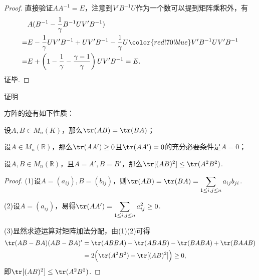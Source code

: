 \begin{proof}
	直接验证$AA^{-1}=E$，注意到$V'B^{-1}U$作为一个数可以提到矩阵乘积外，有
	\begin{align*}
		  & {}A(B^{-1}-\frac{1}{\gamma}B^{-1}UV'B^{-1})                                                     \\
		= & {}E-\frac{1}{\gamma}UV'B^{-1}+UV'B^{-1}-\frac{1}{\gamma}U{\color{red!70!blue}V'B^{-1}U}V'B^{-1} \\
		= & {}E+\left(1-\frac{1}{\gamma}-\frac{\gamma-1}{\gamma}\right)UV'B^{-1}=E.
	\end{align*}
	证毕.
\end{proof}
\begin{prob}[23]
	\hypertarget{TraceProperty}{证明}方阵的迹有如下性质：
	\begin{mylist}
		\item 设$A,B\in M_n(K)$，那么$\tr(AB)=\tr(BA)$；
		\item 设$A\in M_n(\mathbb{R})$，那么$\tr(AA')\ge0$且$\tr(AA')=0$的充分必要条件是$A=0$；
		\item 设$A,B\in M_n(\mathbb{R})$，且$A=A',B=B'$，那么$\tr[(AB)^2]\le\tr(A^2B^2)$.
	\end{mylist}
\end{prob}
\begin{proof}
	(1)设$A=(a_{ij}),B=(b_{ij})$，则$\tr(AB)=\tr(BA)=\displaystyle\sum_{1\le i,j\le n}a_{ij}b_{ji}$.\par
	(2)设$A=(a_{ij})$，易得$\tr(AA')=\displaystyle\sum_{1\le i,j\le n}a_{ij}^2\ge0$.\par
	(3)显然求迹运算对矩阵加法分配，由(1)(2)可得
	\begin{align*}
		\tr(AB-BA)(AB-BA)'
		 & =\tr(ABBA)-\tr(ABAB)-\tr(BABA)+\tr(BAAB) \\
		 & =2\Big(\tr(A^2B^2)-\tr[(AB)^2]\Big)\ge0,
	\end{align*}
	即$\tr[(AB)^2]\le\tr(A^2B^2)$.
\end{proof}
